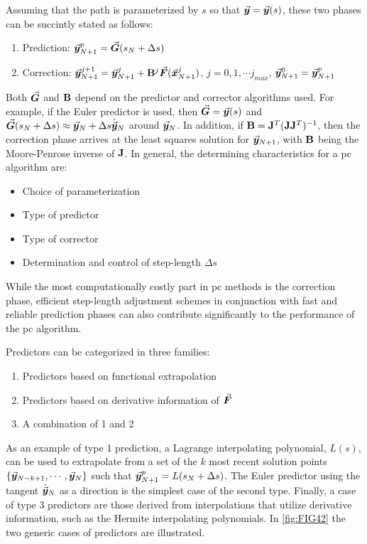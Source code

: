 Assuming that the path is parameterized by $s$ so that
$\vec{\bm{y}}=\vec{\bm{y}}(s)$, these two phases can be succintly stated as follows:
\begin{enumerate}[noitemsep]
	\item Prediction: $\vec{\bm{y}}^p_{N+1}=\vec{\bm{G}}(s_N+\Delta s)$
	\item Correction: $\vec{\bm{y}}^{j+1}_{N+1} = 
	\vec{\bm{y}}^j_{N+1}+\mathbf{B}^j\vec{\bm{F}}(\vec{\bm{x}}^j_{N+1})$, $j=0,1,\cdots
	j_{max}$, $\vec{\bm{y}}^0_{N+1}=\vec{\bm{y}}^p_{N+1}$
\end{enumerate}
Both $\vec{\bm{G}}$ and $\mathbf{B}$ depend on the predictor and corrector algorithms 
used. For
example, if the Euler predictor is used, then $\vec{\bm{G}}=\vec{\bm{y}}(s)$ and 
$\vec{\bm{G}}(s_N+\Delta
s)\approx \vec{\bm{y}}_N+\Delta s \dot{\vec{\bm{y}}}_N$ around $\vec{\bm{y}}_N$. In 
addition, if $\mathbf{B} = \mathbf{J}^T(\mathbf{J}\mathbf{J}^T)^{-1}$, then the
correction phase arrives at the least squares solution for $\vec{\bm{y}}_{N+1}$, 
with $\mathbf{B}$ being the Moore-Penrose inverse of $\mathbf{J}$. 
In general, the determining characteristics for a \acrshort{pc} algorithm are:
\begin{itemize}[noitemsep]
	\item Choice of parameterization 
	\item Type of predictor
	\item Type of corrector
	\item Determination and control of step-length $\Delta s$
\end{itemize}
While the most computationally costly part in \acrshort{pc} methods is the 
correction phase, efficient step-length adjustment schemes in conjunction with 
fast and reliable prediction phases can also
contribute significantly to the performance of the \acrshort{pc} algorithm.

Predictors can be categorized in three families:
\begin{enumerate}[noitemsep]
	\item Predictors based on functional extrapolation
	\item Predictors based on derivative information of $\vec{\bm{F}}$
	\item A combination of 1 and 2
\end{enumerate}
As an example of type 1 prediction, a Lagrange interpolating polynomial, $L(s)$,
can be used to extrapolate from a set of the $k$ most recent solution points 
$\{\vec{\bm{y}}_{N-k+1},\cdots,\vec{\bm{y}}_N\}$ such that 
$\vec{\bm{y}}^p_{N+1}=L(s_N+\Delta
s)$\cite{Rheinboldt75,Deuflhard87}. The
Euler predictor using the tangent $\dot{\vec{\bm{y}}}_N$ as a direction is the 
simplest
case of the second type. Finally, a case of type 3 predictors are those derived 
from interpolations that utilize derivative information, such as the Hermite 
interpolating polynomials. In \ref{fig:FIG42} the two generic cases of 
predictors are illustrated.

